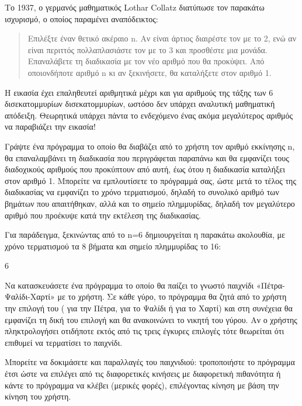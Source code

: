 \documentclass[a4paper,11pt,oneside]{book}
\begin{document}
\begin{exercise} %
Το 1937, ο γερμανός μαθηματικός Lothar Collatz διατύπωσε τον παρακάτω ισχυρισμό, ο οποίος παραμένει αναπόδεικτος:
\begin{quote}
Επιλέξτε έναν θετικό ακέραιο n. Αν είναι άρτιος διαιρέστε τον με το 2, ενώ αν είναι περιττός πολλαπλασιάστε τον με το 3 και προσθέστε μια μονάδα. Επαναλάβετε τη διαδικασία με τον νέο αριθμό που θα προκύψει. Από οποιονδήποτε αριθμό n κι αν ξεκινήσετε, θα καταλήξετε στον αριθμό 1.
\end{quote}
Η εικασία %
έχει επαληθευτεί αριθμητικά μέχρι και για αριθμούς της τάξης των 6 δισεκατομμυρίων δισεκατομμυρίων, ωστόσο δεν υπάρχει αναλυτική μαθηματική απόδειξη. Θεωρητικά υπάρχει πάντα το ενδεχόμενο ένας ακόμα μεγαλύτερος αριθμός να παραβιάζει την εικασία!

Γράψτε ένα πρόγραμμα %
%
το οποίο θα διαβάζει από το χρήστη τον αριθμό εκκίνησης n, θα επαναλαμβάνει τη διαδικασία 
που περιγράφεται παραπάνω και θα εμφανίζει τους διαδοχικούς αριθμούς που προκύπτουν από αυτή, έως ότου η διαδικασία καταλήξει στον αριθμό 1. Μπορείτε να εμπλουτίσετε το πρόγραμμά σας, ώστε μετά το τέλος της διαδικασίας να εμφανίζει το χρόνο τερματισμού, δηλαδή το συνολικό αριθμό των βημάτων που απαιτήθηκαν, αλλά και το σημείο πλημμυρίδας, δηλαδή τον μεγαλύτερο αριθμό που προέκυψε κατά την εκτέλεση της διαδικασίας.

\begin{note}
Για παράδειγμα, ξεκινώντας από το n=6 δημιουργείται η παρακάτω ακολουθία, με χρόνο τερματισμού τα 8 βήματα και σημείο πλημμυρίδας το 16:
\begin{center}
6
\end{center}
\end{note}
\end{exercise}

\begin{exercise}
Να κατασκευάσετε ένα πρόγραμμα το οποίο θα παίζει το γνωστό παιχνίδι «Πέτρα-Ψαλίδι-Χαρτί» με το χρήστη. Σε κάθε γύρο, το πρόγραμμα θα ζητά από το χρήστη την επιλογή του ( για την Πέτρα,  για το Ψαλίδι ή  για το Χαρτί) και στη συνέχεια θα εμφανίζει τη δική του επιλογή και θα ανακοινώνει το νικητή του γύρου. Αν ο χρήστης πληκτρολογήσει οτιδήποτε εκτός από τις τρεις έγκυρες επιλογές τότε θεωρείται ότι επιθυμεί να τερματίσει το παιχνίδι. 

Μπορείτε να δοκιμάσετε και παραλλαγές του παιχνιδιού: τροποποιήστε το πρόγραμμα έτσι ώστε να επιλέγει από τις διαφορετικές κινήσεις με διαφορετική πιθανότητα ή κάντε το πρόγραμμα να κλέβει (μερικές φορές), επιλέγοντας κίνηση με βάση την κίνηση του χρήστη.
\end{exercise}
\end{document}
